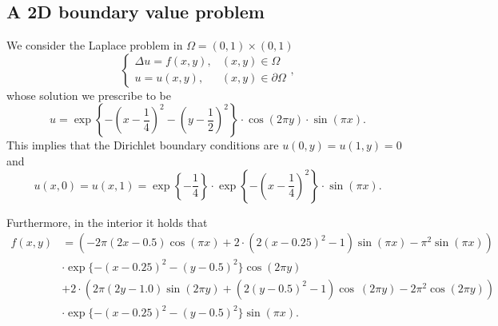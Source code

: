 \documentclass[12pt]{report} %
\begin{document}
\subsection*{A 2D boundary value problem}

We consider the Laplace problem in $\Omega = (0, 1) \times (0, 1)$
\[ \left\{\begin{array}{ll}
     \Delta u = f (x, y), & (x, y) \in \Omega\\
     u = u (x, y), & (x, y) \in \partial \Omega
   \end{array}\right., \]
whose solution we prescribe to be
\[ u = \exp \left\{ - \left( x - \frac{1}{4} \right)^2 - \left( y -
   \frac{1}{2} \right)^2 \right\} \cdot \cos (2 \pi y) \cdot \sin (\pi x) . \]
This implies that the Dirichlet boundary conditions are $u (0, y) = u (1, y) =
0$ and
\[ u (x, 0) = u (x, 1) = \exp \left\{ - \frac{1}{4} \right\} \cdot \exp
   \left\{ - \left( x - \frac{1}{4} \right)^2 \right\} \cdot \sin (\pi x) . \]

Furthermore, in the interior it holds that
\begin{align*}
  f(x,y) &= \left(- 2 \pi \left(2 x - 0.5\right) \cos{\left(\pi x \right)} + 2 \cdot \left
  (2 \left(x - 0.25\right)^{2} - 1\right) \sin{\left(\pi x \right)} - \pi^{2} \sin
  {\left(\pi x \right)}\right) \\ 
  &\cdot \exp\{- \left(x - 0.25\right)^{2} - \left(y - 0.5\right
  )^{2}\} \cos{\left(2 \pi y \right)} \\ &+  2 \cdot \left(2 \pi \left(2 y - 1.0\right) 
  \sin{\left(2 \pi y \right)} + \left(2 \left(y - 0.5\right)^{2} - 1\right) \cos{\
  \left(2 \pi y \right)} - 2 \pi^{2} \cos{\left(2 \pi y \right)}\right) \\
  &\cdot \exp\{- \left
  (x - 0.25\right)^{2} - \left(y - 0.5\right)^{2}\} \sin{\left(\pi x \right)}.
\end{align*}
\end{document}
